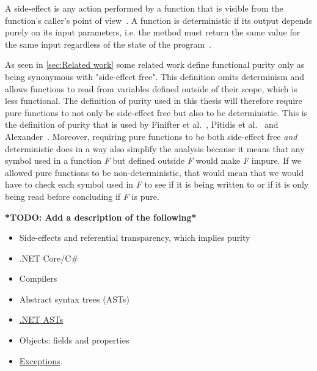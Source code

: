 \documentclass[a4paper,12pt]{article}
\begin{document}
A side-effect is any action performed by a function that is visible from the function's caller's point of view~\cite{purity-in-javascript}. A function is deterministic if its output depends purely on its input parameters, i.e. the method must return the same value for the same input regardless of the state of the program~\cite{purity-in-java}.

As seen in \autoref{sec:Related work} some related work define functional purity only as being synonymous with "side-effect free". This definition omits determinism and allows functions to read from variables defined outside of their scope, which is less functional. The definition of purity used in this thesis will therefore require pure functions to not only be side-effect free but also to be deterministic. This is the definition of purity that is used by Finifter et al.~\cite{purity-in-java}, Pitidis et al.~\cite{pitidis2010purity} and Alexander~\cite{alvin-alexander}. %
Moreover, requiring pure functions to be both side-effect free \textit{and} deterministic does in a way also simplify the analysis because it means that any symbol used in a function \textit{F} but defined outside \textit{F} would make \textit{F} impure. If we allowed pure functions to be non-deterministic, that would mean that we would have to check each symbol used in \textit{F} to see if it is being written to or if it is only being read before concluding if \textit{F} is pure.


\noindent\makebox[\linewidth]{\rule{\textwidth}{0.4pt}} %

\textbf{*TODO: Add a description of the following*}
\begin{itemize}
  \item Side-effects and referential transparency, which implies purity~\cite{purity-in-javascript}
  \item .NET Core/C\#
  \item Compilers
  \item Abstract syntax trees (ASTs)
  \item \href{https://docs.microsoft.com/en-us/dotnet/csharp/roslyn-sdk/work-with-syntax}{.NET ASTs}~\cite{albahari2003nutshell}
  \item Objects: fields and properties %
  \item \href{https://docs.microsoft.com/en-us/dotnet/csharp/programming-guide/exceptions/}{Exceptions}.
\end{itemize}
\end{document}
